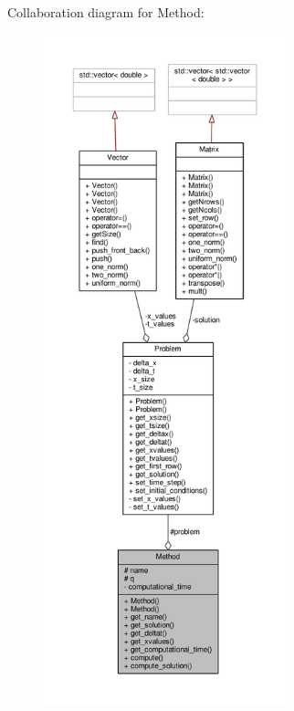 Collaboration diagram for Method\+:
\nopagebreak
\begin{figure}[H]
\begin{center}
\leavevmode
\includegraphics[height=550pt]{classMethod__coll__graph}
\end{center}
\end{figure}
